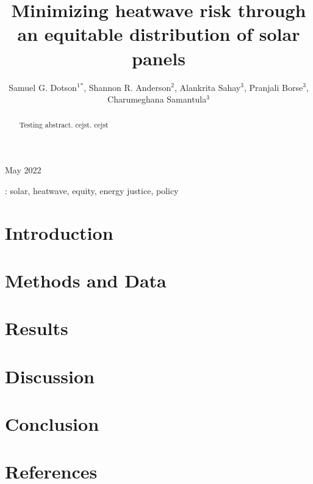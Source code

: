 \documentclass[12pt]{iopart}
\begin{document}
\title[Minimizing heatwave risk through an equitable distribution of solar panels]{Minimizing
heatwave risk through an equitable distribution of solar panels}

 \author{
 Samuel G. Dotson$^1$$^*$,
 Shannon R. Anderson$^2$,
 Alankrita Sahay$^3$,
 Pranjali Borse$^3$,
 Charumeghana Samantula$^3$
 }

 \address{ $^1$ Department of Nuclear, Plasma, and Radiological Engineering,
 University of Illinois Urbana-Champaign, Urbana IL, United States}
  \address{ $^2$ Department of  Natural Resources and Environmental Sciences,
 University of Illinois Urbana-Champaign, Urbana IL, United States}
  \address{ $^3$ Department of Civil and Environmental Engineering,
 University of Illinois Urbana-Champaign, Urbana IL, United States}
 \address{$^*$ Author to whom correspondence should be addressed}


 \begin{indented}
 \vspace{10pt}
 \item[]May 2022
 \end{indented}

 \begin{abstract}
 Testing abstract. \ac{cejst}. \ac{cejst}
 \end{abstract}

 \vspace{2pc}
: solar, heatwave, equity, energy justice, policy

\acresetall

\section{Introduction}

\section{Methods and Data}


\section{Results}

\section{Discussion}

\section{Conclusion}

% 
\section*{References}



 
\end{document}
